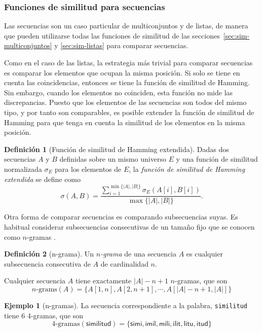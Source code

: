 \documentclass[a4paper,10pt,twoside]{article}
\theoremstyle{definition}
\newtheorem{definition}{Definición}
\newtheorem{example}{Ejemplo}
\begin{document}
\subsubsection{Funciones de similitud para secuencias}
\label{sec:sim-secuencias}
Las secuencias son un caso particular de multiconjuntos y de listas, de manera que pueden utilizarse todas las funciones de similitud de las
secciones~\ref{sec:sim-multiconjuntos} y \ref{sec:sim-listas} para comparar secuencias.

Como en el caso de las listas, la estrategia más trivial para comparar secuencias es comparar los elementos que ocupan la misma posición.
Si solo se tiene en cuenta las coincidencias, entonces se tiene la función de similitud de Hamming.
Sin embargo, cuando los elementos no coinciden, esta función no mide las discrepancias.
Puesto que los elementos de las secuencias son todos del mismo tipo, y por tanto son comparables, es posible extender la función de similitud de Hamming para que tenga en cuenta la similitud de los elementos en la misma posición. 

\begin{definition}[Función de similitud de Hamming extendida]
Dadas dos secuencias $A$ y $B$ definidas sobre un mismo universo $E$ y una función de similitud normalizada $\sigma_E$ para los elementos de $E$,
la \emph{función de similitud de Hamming extendida} se define como
\[
\sigma(A,B)=\frac{\sum_{i=1}^{\min\{|A|,|B|\}}\sigma_E(A[i],B[i])}{\max\{|A|,|B|\}}.
\]
\end{definition}

Otra forma de comparar secuencias es comparando subsecuencias suyas.
Es habitual considerar subsecuencias consecutivas de un tamaño fijo que se conocen como $n$-gramas \cite{kondrak2005ngram}. 

\begin{definition}[n-grama]
Un $n$\emph{-grama} de una secuencia $A$ es cualquier subsecuencia consecutiva de $A$ de cardinalidad $n$.
\end{definition}

Cualquier secuencia $A$ tiene exactamente $|A|-n+1$ $n$-gramas, que son
\[
n\mbox{-grams}(A)=\{A[1,n],A[2,n+1],\cdots,A[|A|-n+1,|A|]\}
\]

\begin{example}[n-gramas]
La secuencia correspondiente a la palabra, \texttt{similitud} tiene 6 4-gramas, que son 
\[
4\mbox{-gramas}(\textsf{similitud})=\{\textsf{simi}, \textsf{imil}, \textsf{mili}, \textsf{ilit}, \textsf{litu}, \textsf{itud}\}
\]
\end{example}
\end{document}

